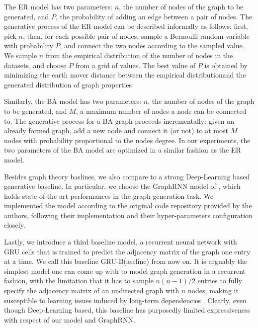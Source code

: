 The ER model has two parameters: $n$, the number of nodes of the graph to be generated, and $P$, the probability of adding an edge between a pair of nodes. The generative process of the ER model can be described informally as follows: first, pick $n$, then, for each possible pair of nodes, sample a Bernoulli random variable with probability $P$, and connect the two nodes according to the sampled value. We sample $n$ from the empirical distribution of the number of nodes in the datasets, and choose $P$ from a grid of values. The best value of $P$ is obtained by minimizing the earth mover distance between the empirical distributionand the generated distribution of graph properties

Similarly, the BA model has two parameters: $n$, the number of nodes of the graph to be generated, and $M$, a maximum number of nodes a node can be connected to. The generative process for a BA graph proceeds incrementally: given an already formed graph, add a new node and connect it (or not) to at most $M$ nodes with probability proportional to the nodes degree. In our experiments, the two parameters of the BA model are optimized in a similar fashion as the ER model.

Besides graph theory baslines, we also compare to a strong Deep-Learning based generative baseline. In particular, we choose the GraphRNN model of \citet{you2018graphrnn}, which holds state-of-the-art performances in the graph generation task. We implemented the model according to the original code repository provided by the authors, following their implementation and their hyper-parameters configuration closely.

Lastly, we introduce a third baseline model, a recurrent neural network with GRU cells that is trained to predict the adjacency matrix of the graph one entry at a time. We call this baseline GRU-B(aseline) from now on. It is arguably the simplest model one can come up with to model graph generation in a recurrent fashion, with the limitation that it has to sample $n(n-1)/2$ entries to fully specify the adjacency matrix of an undirected graph with $n$ nodes, making it susceptible to learning issues induced by long-term dependencies \citep{bengio1994learninglongtermdependenciesdifficult}. Clearly, even though Deep-Learning based, this baseline has purposedly limited expressiveness with respect of our model and GraphRNN.

